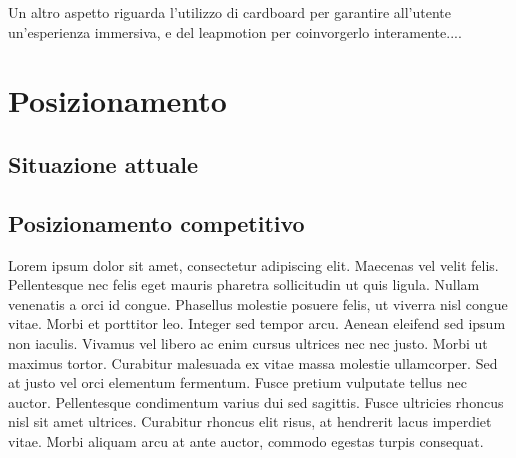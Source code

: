 \documentclass[11pt,fleqn]{book} %
\begin{document}
Un altro aspetto riguarda l'utilizzo di cardboard per garantire all'utente un'esperienza immersiva, e del leapmotion per coinvorgerlo interamente....







\chapter{Posizionamento}

\section{Situazione attuale}


\newpage
\section{Posizionamento competitivo}
Lorem ipsum dolor sit amet, consectetur adipiscing elit. Maecenas vel velit felis. Pellentesque nec felis eget mauris pharetra sollicitudin ut quis ligula. Nullam venenatis a orci id congue. Phasellus molestie posuere felis, ut viverra nisl congue vitae. Morbi et porttitor leo. Integer sed tempor arcu. Aenean eleifend sed ipsum non iaculis. Vivamus vel libero ac enim cursus ultrices nec nec justo. Morbi ut maximus tortor. Curabitur malesuada ex vitae massa molestie ullamcorper. Sed at justo vel orci elementum fermentum. Fusce pretium vulputate tellus nec auctor. Pellentesque condimentum varius dui sed sagittis. Fusce ultricies rhoncus nisl sit amet ultrices. Curabitur rhoncus elit risus, at hendrerit lacus imperdiet vitae. Morbi aliquam arcu at ante auctor, commodo egestas turpis consequat.
\end{document}
